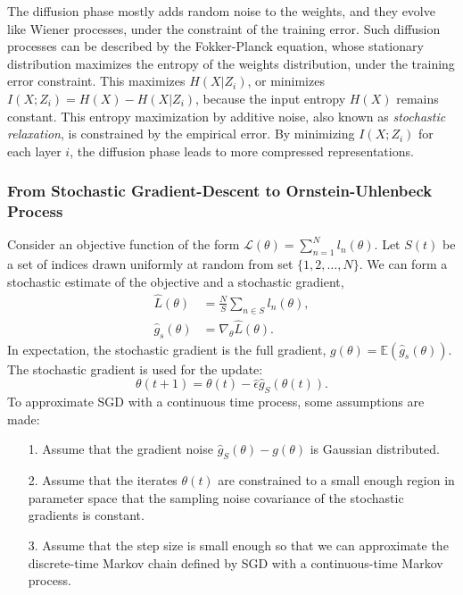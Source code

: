 \documentclass[11pt]{article}
\begin{document}
The diffusion phase mostly adds random noise to the weights, and they evolve like Wiener processes, under the constraint of the training error. Such diffusion processes can be described by the Fokker-Planck equation, whose stationary distribution maximizes the entropy of the weights distribution, under the training error constraint. This maximizes $H(X\vert Z_i)$, or minimizes $I(X;Z_i) = H(X) - H(X\vert Z_i)$, because the input entropy $H(X)$ remains constant. This entropy maximization by additive noise, also known as \emph{stochastic relaxation}, is constrained by the empirical error. By minimizing $I(X;Z_i)$ for each layer $i$, the diffusion phase leads to more compressed representations.

\subsubsection*{From Stochastic Gradient-Descent to Ornstein-Uhlenbeck Process}

Consider an objective function of the form $\mathcal L(\theta) = \sum_{n=1}^N l_n(\theta)$. Let $S(t)$ be a set of indices drawn uniformly at random from set $\{1,2,\dots,N\}$. We can form a stochastic estimate of the objective and a stochastic gradient,
\begin{align}
\hat L(\theta) &= \frac{N}{S} \sum_{n\in S} l_n(\theta),\\
\hat g_s(\theta) &= \nabla_\theta  \hat L(\theta).
\end{align}
In expectation, the stochastic gradient is the full gradient, $g(\theta) = \mathbb E(\hat{g}_s(\theta) )$. The stochastic gradient is used for the update:
\begin{equation}
\theta(t+1) = \theta(t) - \hat\epsilon \hat g_S(\theta(t)).
\end{equation}
To approximate SGD with a continuous time process, some assumptions are made:
\begin{itemize}
\item[1.] Assume that the gradient noise $\hat g_S(\theta)-g(\theta) $ is Gaussian distributed.
\item[2.] Assume that the iterates $\theta(t)$ are constrained to a small enough region in parameter space that the sampling noise covariance of the stochastic gradients is constant.
\item[3.] Assume that the step size is small enough so that we can approximate the discrete-time Markov chain defined by SGD with a continuous-time Markov process.
\end{itemize}
\end{document}
